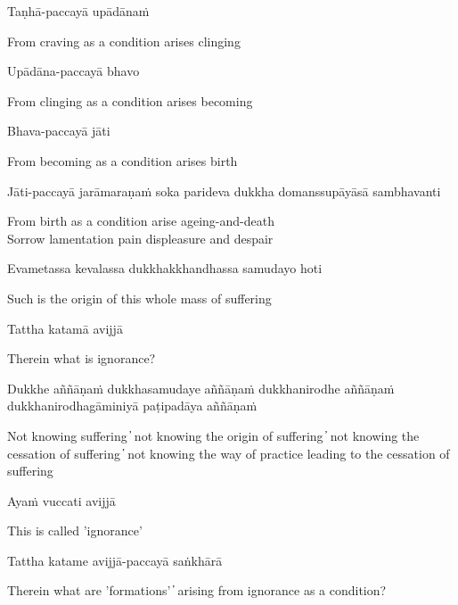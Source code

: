 Taṇhā-paccayā upādānaṁ

\begin{cprenglish}
  From craving as a condition arises clinging
\end{cprenglish}

Upādāna-paccayā bhavo

\begin{cprenglish}
  From clinging as a condition arises becoming
\end{cprenglish}

Bhava-paccayā jāti

\begin{cprenglish}
  From becoming as a condition arises birth
\end{cprenglish}

Jāti-paccayā jarāmaraṇaṁ soka parideva dukkha domanssupāyāsā sambhavanti

\begin{cprenglish}
  From birth as a condition arise ageing-and-death\\
  Sorrow lamentation pain displeasure and despair
\end{cprenglish}

Evametassa kevalassa dukkhakkhandhassa samudayo hoti

\begin{cprenglish}
  Such is the origin of this whole mass of suffering
\end{cprenglish}

Tattha katamā avijjā

\begin{cprenglish}
  Therein what is ignorance?
\end{cprenglish}

Dukkhe aññāṇaṁ dukkhasamudaye aññāṇaṁ dukkhanirodhe aññāṇaṁ dukkhanirodhagāminiyā paṭipadāya aññāṇaṁ

\begin{cprenglish}
  Not knowing suffering  ̓  not knowing the origin of suffering  ̓  not knowing the cessation of suffering  ̓  not knowing the way of practice leading to the cessation of suffering
\end{cprenglish}

Ayaṁ vuccati avijjā

\begin{cprenglish}
  This is called 'ignorance'
\end{cprenglish}

Tattha katame avijjā-paccayā saṅkhārā

\begin{cprenglish}
  Therein what are 'formations'  ̓  arising from ignorance as a condition?
\end{cprenglish}

